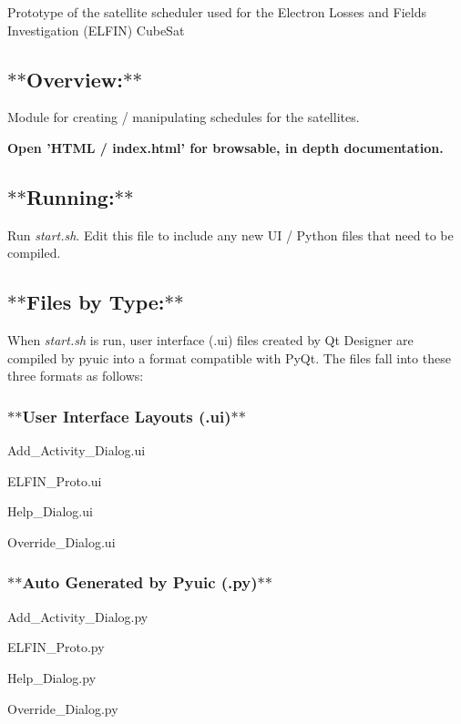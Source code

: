 Prototype of the satellite scheduler used for the Electron Losses and Fields Investigation (E\-L\-F\-I\-N) Cube\-Sat

\subsection*{$\ast$$\ast$\-Overview\-:$\ast$$\ast$}

Module for creating / manipulating schedules for the satellites.

{\bfseries Open 'H\-T\-M\-L / index.\-html' for browsable, in depth documentation.}



\subsection*{$\ast$$\ast$\-Running\-:$\ast$$\ast$}

Run {\itshape start.\-sh}. Edit this file to include any new U\-I / Python files that need to be compiled.

\subsection*{$\ast$$\ast$\-Files by Type\-:$\ast$$\ast$}

When {\itshape start.\-sh} is run, user interface (.ui) files created by Qt Designer are compiled by pyuic into a format compatible with Py\-Qt. The files fall into these three formats as follows\-:

\subsubsection*{$\ast$$\ast$\-User Interface Layouts (.ui)$\ast$$\ast$}


\begin{DoxyItemize}
\item Add\-\_\-\-Activity\-\_\-\-Dialog.\-ui
\item E\-L\-F\-I\-N\-\_\-\-Proto.\-ui
\item Help\-\_\-\-Dialog.\-ui
\item Override\-\_\-\-Dialog.\-ui
\end{DoxyItemize}

\subsubsection*{$\ast$$\ast$\-Auto Generated by Pyuic (.py)$\ast$$\ast$}


\begin{DoxyItemize}
\item Add\-\_\-\-Activity\-\_\-\-Dialog.\-py
\item E\-L\-F\-I\-N\-\_\-\-Proto.\-py
\item Help\-\_\-\-Dialog.\-py
\item Override\-\_\-\-Dialog.\-py
\end{DoxyItemize}


